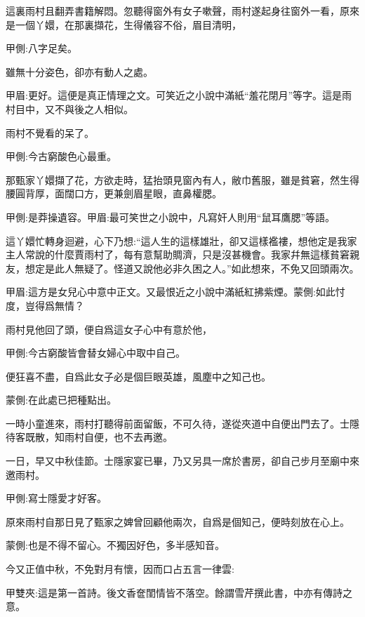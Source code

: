 \begin{parag}
    這裏雨村且翻弄書籍解悶。忽聽得窗外有女子嗽聲，雨村遂起身往窗外一看，原來是一個丫嬛，在那裏擷花，生得儀容不俗，眉目清明，\begin{note}甲側:八字足矣。\end{note}雖無十分姿色，卻亦有動人之處。\begin{note}甲眉:更好。這便是真正情理之文。可笑近之小說中滿紙“羞花閉月”等字。這是雨村目中，又不與後之人相似。\end{note}雨村不覺看的呆了。\begin{note}甲側:今古窮酸色心最重。\end{note}那甄家丫嬛擷了花，方欲走時，猛抬頭見窗內有人，敝巾舊服，雖是貧窘，然生得腰圓背厚，面闊口方，更兼劍眉星眼，直鼻權腮。\begin{note}甲側:是莽操遺容。甲眉:最可笑世之小說中，凡寫奸人則用“鼠耳鷹腮”等語。\end{note}這丫嬛忙轉身迴避，心下乃想:“這人生的這樣雄壯，卻又這樣襤褸，想他定是我家主人常說的什麼賈雨村了，每有意幫助賙濟，只是沒甚機會。我家幷無這樣貧窘親友，想定是此人無疑了。怪道又說他必非久困之人。”如此想來，不免又回頭兩次。\begin{note}甲眉:這方是女兒心中意中正文。又最恨近之小說中滿紙紅拂紫煙。蒙側:如此忖度，豈得爲無情？\end{note}雨村見他回了頭，便自爲這女子心中有意於他，\begin{note}甲側:今古窮酸皆會替女婦心中取中自己。\end{note}便狂喜不盡，自爲此女子必是個巨眼英雄，風塵中之知己也。\begin{note}蒙側:在此處已把種點出。\end{note}一時小童進來，雨村打聽得前面留飯，不可久待，遂從夾道中自便出門去了。士隱待客既散，知雨村自便，也不去再邀。
\end{parag}


\begin{parag}
    一日，早又中秋佳節。士隱家宴已畢，乃又另具一席於書房，卻自己步月至廟中來邀雨村。\begin{note}甲側:寫士隱愛才好客。\end{note}原來雨村自那日見了甄家之婢曾回顧他兩次，自爲是個知己，便時刻放在心上。\begin{note}蒙側:也是不得不留心。不獨因好色，多半感知音。\end{note}今又正值中秋，不免對月有懷，因而口占五言一律雲:\begin{note}甲雙夾:這是第一首詩。後文香奩閨情皆不落空。餘謂雪芹撰此書，中亦有傳詩之意。\end{note}
\end{parag}


